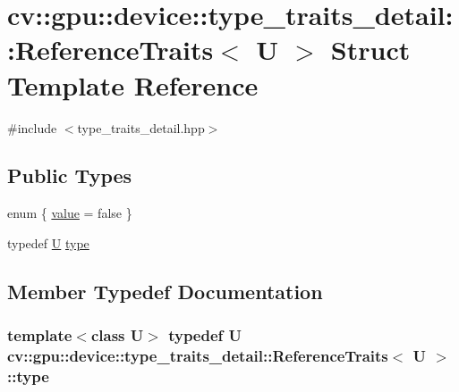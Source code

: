 \hypertarget{structcv_1_1gpu_1_1device_1_1type__traits__detail_1_1ReferenceTraits}{\section{cv\-:\-:gpu\-:\-:device\-:\-:type\-\_\-traits\-\_\-detail\-:\-:Reference\-Traits$<$ U $>$ Struct Template Reference}
\label{structcv_1_1gpu_1_1device_1_1type__traits__detail_1_1ReferenceTraits}
}


{\ttfamily \#include $<$type\-\_\-traits\-\_\-detail.\-hpp$>$}

\subsection*{Public Types}
\begin{DoxyCompactItemize}
\item 
enum \{ \hyperlink{structcv_1_1gpu_1_1device_1_1type__traits__detail_1_1ReferenceTraits_a76ead04bfeca4bfa81ab1d713fd9d29aa933ee35cfe5746b8d6912c09c8683e28}{value} = false
 \}
\item 
typedef \hyperlink{core__c_8h_aa9c521f41af9a5191e5e4b6ffbae211a}{U} \hyperlink{structcv_1_1gpu_1_1device_1_1type__traits__detail_1_1ReferenceTraits_a60a9c9772f64965c263e072726e616c2}{type}
\end{DoxyCompactItemize}


\subsection{Member Typedef Documentation}
\hypertarget{structcv_1_1gpu_1_1device_1_1type__traits__detail_1_1ReferenceTraits_a60a9c9772f64965c263e072726e616c2}{
\subsubsection[{type}]{\setlength{\rightskip}{0pt plus 5cm}template$<$class U$>$ typedef {\bf U} {\bf cv\-::gpu\-::device\-::type\-\_\-traits\-\_\-detail\-::\-Reference\-Traits}$<$ {\bf U} $>$\-::{\bf type}}}\label{structcv_1_1gpu_1_1device_1_1type__traits__detail_1_1ReferenceTraits_a60a9c9772f64965c263e072726e616c2}


